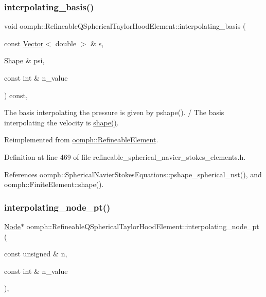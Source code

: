 \subsubsection{\texorpdfstring{interpolating\+\_\+basis()}{interpolating\_basis()}}
{\footnotesize\ttfamily void oomph\+::\+Refineable\+Q\+Spherical\+Taylor\+Hood\+Element\+::interpolating\+\_\+basis (\begin{DoxyParamCaption}\item[{const \hyperlink{classoomph_1_1Vector}{Vector}$<$ double $>$ \&}]{s,  }\item[{\hyperlink{classoomph_1_1Shape}{Shape} \&}]{psi,  }\item[{const int \&}]{n\+\_\+value }\end{DoxyParamCaption}) const\hspace{0.3cm}{\ttfamily [inline]}, {\ttfamily [virtual]}}



The basis interpolating the pressure is given by pshape(). / The basis interpolating the velocity is \hyperlink{classoomph_1_1FiniteElement_a58a25b6859ddd43b7bfe64a19fee5023}{shape()}. 



Reimplemented from \hyperlink{classoomph_1_1RefineableElement_a8ca420443c28708e5c6315a80f520137}{oomph\+::\+Refineable\+Element}.



Definition at line 469 of file refineable\+\_\+spherical\+\_\+navier\+\_\+stokes\+\_\+elements.\+h.



References oomph\+::\+Spherical\+Navier\+Stokes\+Equations\+::pshape\+\_\+spherical\+\_\+nst(), and oomph\+::\+Finite\+Element\+::shape().

\mbox{\label{classoomph_1_1RefineableQSphericalTaylorHoodElement_a9c7304678e11298ff3a1d9ead5ea9675}} 
\subsubsection{\texorpdfstring{interpolating\+\_\+node\+\_\+pt()}{interpolating\_node\_pt()}}
{\footnotesize\ttfamily \hyperlink{classoomph_1_1Node}{Node}$\ast$ oomph\+::\+Refineable\+Q\+Spherical\+Taylor\+Hood\+Element\+::interpolating\+\_\+node\+\_\+pt (\begin{DoxyParamCaption}\item[{const unsigned \&}]{n,  }\item[{const int \&}]{n\+\_\+value }\end{DoxyParamCaption})\hspace{0.3cm}{\ttfamily [inline]}, {\ttfamily [virtual]}}



